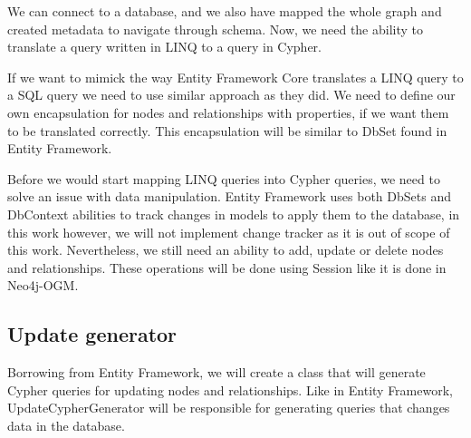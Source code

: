 We can connect to a database, and we also have mapped the whole graph and created metadata to navigate through schema. Now, we need the ability to translate a query written in LINQ to a query in Cypher.

If we want to mimick the way Entity Framework Core translates a LINQ query to a SQL query we need to use similar approach as they did. We need to define our own encapsulation for nodes
and relationships with properties, if we want them to be translated correctly. This encapsulation will be similar to DbSet found in Entity Framework.

Before we would start mapping LINQ queries into Cypher queries, we need to solve an issue with data manipulation. Entity Framework uses both DbSets and DbContext abilities to track
changes in models to apply them to the database, in this work however, we will not implement change tracker as it is out of scope of this work. Nevertheless, we still
need an ability to add, update or delete nodes and relationships. These operations will be done using Session like it is done in Neo4j-OGM.

\subsection{Update generator}

Borrowing from Entity Framework, we will create a class that will generate Cypher queries for updating nodes and relationships.
Like in Entity Framework, UpdateCypherGenerator will be responsible for generating queries that changes data in the database.



